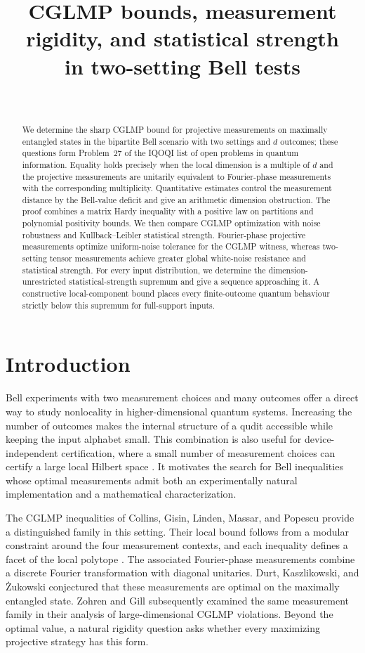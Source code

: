 \documentclass[11pt]{amsart}
\title[CGLMP bounds and statistical strength]
{CGLMP bounds, measurement rigidity, and statistical strength\\
in two-setting Bell tests}
\author{\ }
\date{}
\theoremstyle{remark}
\theoremstyle{plain}
\numberwithin{equation}{section}
\begin{document}
\begin{abstract}
We determine the sharp CGLMP bound for projective measurements on
maximally entangled states in the bipartite Bell scenario with two
settings and \(d\) outcomes; these questions form Problem~27 of the IQOQI list
of open problems in quantum information. Equality holds precisely when the local
dimension is a multiple of \(d\) and the projective measurements are
unitarily equivalent to Fourier-phase measurements with the
corresponding multiplicity. Quantitative estimates control the
measurement distance by the Bell-value deficit and give an arithmetic
dimension obstruction. The proof combines a matrix Hardy inequality
with a positive law on partitions and polynomial positivity bounds.
We then compare CGLMP optimization with noise robustness and
Kullback--Leibler statistical strength. Fourier-phase projective
measurements optimize uniform-noise tolerance for the CGLMP witness,
whereas two-setting tensor measurements achieve greater global
white-noise resistance and statistical strength. For every input
distribution, we determine the dimension-unrestricted
statistical-strength supremum and give a sequence approaching it.
A constructive local-component bound places every finite-outcome
quantum behaviour strictly below this supremum for full-support inputs.
\end{abstract}
\maketitle

\section{Introduction}\label{sec:introduction}

Bell experiments with two measurement choices and many outcomes offer
a direct way to study nonlocality in higher-dimensional quantum
systems. Increasing the number of outcomes makes the internal
structure of a qudit accessible while keeping the input alphabet
small. This combination is also useful for device-independent
certification, where a small number of measurement choices can
certify a large local Hilbert space \cite{SATWAP,Sarkar}. It motivates
the search for Bell inequalities whose optimal measurements admit
both an experimentally natural implementation and a mathematical
characterization.

The CGLMP inequalities of Collins, Gisin, Linden, Massar, and
Popescu \cite{CGLMP} provide a distinguished family in this setting.
Their local bound follows from a modular constraint around the four
measurement contexts, and each inequality defines a facet of the
local polytope \cite{Masanes}. The associated Fourier-phase
measurements combine a discrete Fourier transformation with diagonal
unitaries. Durt, Kaszlikowski, and \.Zukowski \cite{DKZ} conjectured
that these measurements are optimal on the maximally entangled
state. Zohren and Gill \cite{ZG} subsequently examined the same
measurement family in their analysis of large-dimensional CGLMP
violations. Beyond the optimal value, a natural rigidity question
asks whether every maximizing projective strategy has this form.
\end{document}
